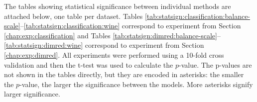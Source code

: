 \documentclass[12pt,a4paper]{report}
\let\openright=\clearpage
\begin{document}



\listoffigures

\listofalgorithmes

\listoftables


\printacronyms[include-classes=abbrev,heading=none] %



 \label{chap:attachments}

The tables showing statistical significance between individual methods are attached below, one table per dataset. Tables \ref{tab:statsign:classification:balance-scale}--\ref{tab:statsign:classification:wine} correspond to experiment from Section \ref{chap:exp:classification} and Tables \ref{tab:statsign:dimred:balance-scale}--\ref{tab:statsign:dimred:wine} correspond to experiment from Section \ref{chap:exp:dimred}. All experiments were performed using a 10-fold cross validation and then the t-test was used to calculate the $p$-value. The p-values are not shown in the tables directly, but they are encoded in asterisks: the smaller the $p$-value, the larger the significance between the models. More asterisks signify larger significance.




\openright
\end{document}
